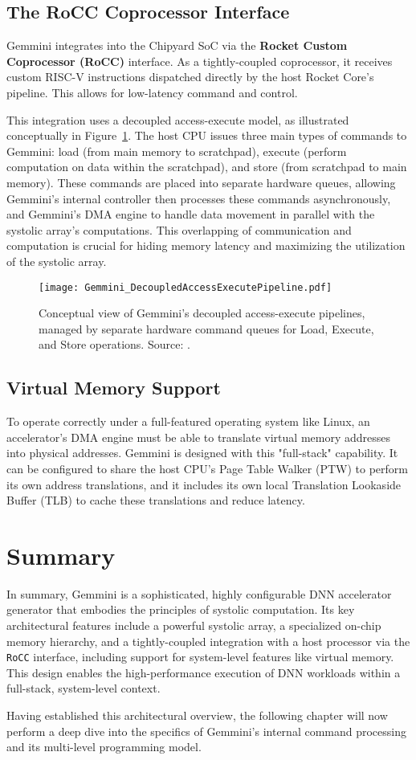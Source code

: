 \subsection{The RoCC Coprocessor Interface}
Gemmini integrates into the Chipyard SoC via the \textbf{Rocket Custom Coprocessor (RoCC)} interface. As a tightly-coupled coprocessor, it receives custom RISC-V instructions dispatched directly by the host Rocket Core's pipeline. This allows for low-latency command and control.

This integration uses a decoupled access-execute model, as illustrated conceptually in Figure~\ref{fig:decoupled_pipelines}. The host CPU issues three main types of commands to Gemmini: load (from main memory to scratchpad), execute (perform computation on data within the scratchpad), and store (from scratchpad to main memory). These commands are placed into separate hardware queues, allowing Gemmini's internal controller then processes these commands asynchronously, and Gemmini's DMA engine to handle data movement in parallel with the systolic array's computations. This overlapping of communication and computation is crucial for hiding memory latency and maximizing the utilization of the systolic array.

\begin{figure}[htbp]
    \centering
    \texttt{[image: Gemmini\_DecoupledAccessExecutePipeline.pdf]}
    \caption{Conceptual view of Gemmini's decoupled access-execute pipelines, managed by separate hardware command queues for Load, Execute, and Store operations. Source: \cite{gemini-dac}.}
    \label{fig:decoupled_pipelines}
\end{figure}

\subsection{Virtual Memory Support}
To operate correctly under a full-featured operating system like Linux, an accelerator's DMA engine must be able to translate virtual memory addresses into physical addresses. Gemmini is designed with this "full-stack" capability. It can be configured to share the host CPU's Page Table Walker (PTW) to perform its own address translations, and it includes its own local Translation Lookaside Buffer (TLB) to cache these translations and reduce latency.

\section{Summary}
\label{sec:gemmini_overview_summary}
In summary, Gemmini is a sophisticated, highly configurable DNN accelerator generator that embodies the principles of systolic computation. Its key architectural features include a powerful systolic array, a specialized on-chip memory hierarchy, and a tightly-coupled integration with a host processor via the \texttt{RoCC} interface, including support for system-level features like virtual memory. This design enables the high-performance execution of DNN workloads within a full-stack, system-level context. 

Having established this architectural overview, the following chapter will now perform a deep dive into the specifics of Gemmini's internal command processing and its multi-level programming model.